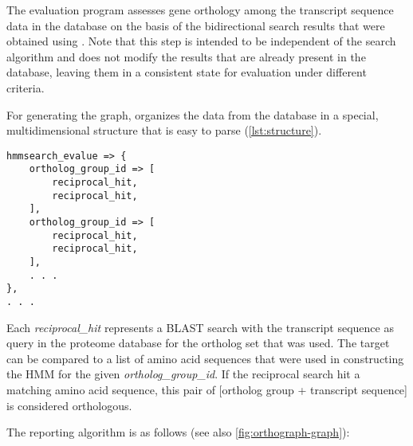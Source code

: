 \label{sec:algorithm-reporting}
The evaluation program  assesses gene orthology among
the transcript sequence data in the database on the basis of the bidirectional
search results that were obtained using . Note that
this step is intended to be independent of the search algorithm and does not
modify the results that are already present in the database, leaving them in a
consistent state for evaluation under different criteria.

For generating the graph,  organizes the data from the
database in a special, multidimensional structure that is easy to parse
(\autoref{lst:structure}).

\begin{lstlisting}[label={lst:structure},caption={Data structure for parsing the triangular
relationships between ortholog groups and transcripts}]
hmmsearch_evalue => {
	ortholog_group_id => [
		reciprocal_hit,
		reciprocal_hit,
	],
	ortholog_group_id => [
		reciprocal_hit,
		reciprocal_hit,
	],
	. . .
},
. . .
\end{lstlisting}

Each \emph{reciprocal\_hit} represents a BLAST search with the transcript
sequence as query in the proteome database for the ortholog set that was used.
The target can be compared to a list of amino acid sequences that were used in
constructing the HMM for the given \emph{ortholog\_group\_id}. If the reciprocal
search hit a matching amino acid sequence, this pair of [ortholog group +
transcript sequence] is considered orthologous.

The reporting algorithm is as follows (see also \autoref{fig:orthograph-graph}):

